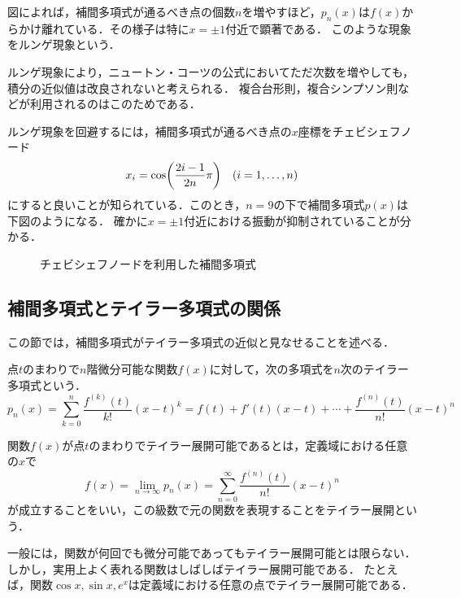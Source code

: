 \documentclass[a4paper]{ltjsarticle}
\theoremstyle{definition}
\DeclarePairedDelimiter{\pqty}{\lparen}{\rparen}
\begin{document}
図によれば，補間多項式が通るべき点の個数$n$を増やすほど，$p_n(x)$は$f(x)$からかけ離れている．その様子は特に$x=\pm 1$付近で顕著である．
このような現象をルンゲ現象という．

ルンゲ現象により，ニュートン・コーツの公式においてただ次数を増やしても，積分の近似値は改良されないと考えられる．
複合台形則，複合シンプソン則などが利用されるのはこのためである．

ルンゲ現象を回避するには，補間多項式が通るべき点の$x$座標をチェビシェフノード
\[
  x_i = \cos\pqty*{\frac{2i-1}{2n} \pi}\quad (i = 1, \dots, n)
\]
にすると良いことが知られている\cite{horinouchi}．このとき，$n=9$の下で補間多項式$p(x)$は下図のようになる．
確かに$x=\pm 1$付近における振動が抑制されていることが分かる．

\begin{figure}[H]
  \centering
  \caption{チェビシェフノードを利用した補間多項式}
\end{figure}

\subsection{補間多項式とテイラー多項式の関係}
この節では，補間多項式がテイラー多項式の近似と見なせることを述べる．

点$t$のまわりで$n$階微分可能な関数$f(x)$に対して，次の多項式を$n$次のテイラー多項式という．
\[
  p_n(x)=\sum_{k=0}^n \frac{f^{(k)}(t)}{k!} (x-t)^k=f(t)+f'(t)(x-t)+\cdots+\frac{f^{(n)}(t)}{n!} (x-t)^n
\]

関数$f(x)$が点$t$のまわりでテイラー展開可能であるとは，定義域における任意の$x$で
\[
  f(x)=\lim_{n\to\infty} p_n(x)=\sum_{n=0}^\infty\frac{f^{(n)}(t)}{n!} (x-t)^n
\]
が成立することをいい，この級数で元の関数を表現することをテイラー展開という．

一般には，関数が何回でも微分可能であってもテイラー展開可能とは限らない．しかし，実用上よく表れる関数はしばしばテイラー展開可能である．
たとえば，関数$\cos x,\sin x,e^x$は定義域における任意の点でテイラー展開可能である．
\end{document}
